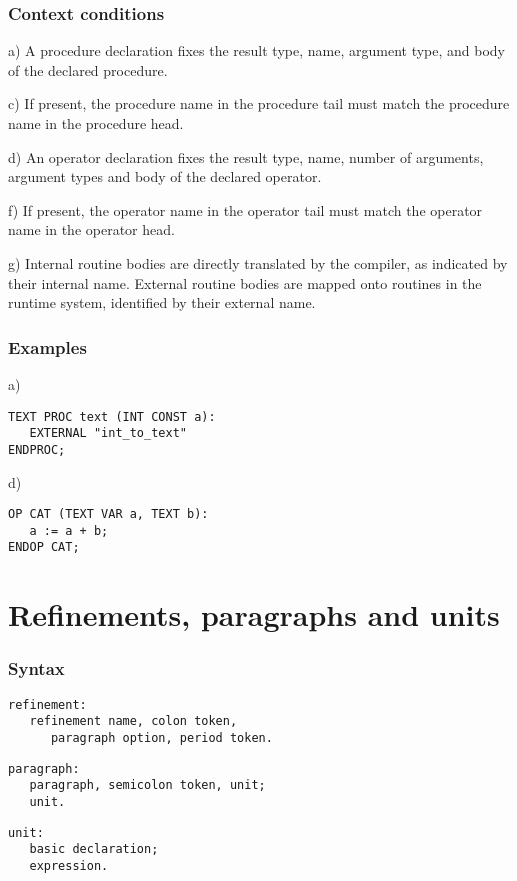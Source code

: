 \documentclass [a4paper,12pt,fleqn]{article}
\begin{document}
\subsubsection*{Context conditions}
\begin{list}{-}{}
\item[a)]
A procedure declaration fixes the result type, name, argument type,
and body of the declared procedure.
\item[c)]
If present, the procedure name in the procedure tail must match
the procedure name in the procedure head.
\item[d)]
An operator declaration fixes the result type, name, number of arguments,
argument types and body of the declared operator.
\item[f)]
If present, the operator name in the operator tail must match
the operator name in the operator head.
\item[g)]
Internal routine bodies are directly translated by the \ELAN compiler,
as indicated by their internal name. External routine bodies are mapped
onto routines in the \ELAN runtime system, identified by their external name.
\end{list}
\subsubsection*{Examples}
\begin{list}{-}{}
\item[a)]
\begin{verbatim}
TEXT PROC text (INT CONST a):
   EXTERNAL "int_to_text"
ENDPROC;
\end{verbatim}
\item[d)] 
\begin{verbatim}
OP CAT (TEXT VAR a, TEXT b):
   a := a + b;
ENDOP CAT;
\end{verbatim}
\end{list}
\section{Refinements, paragraphs and units}
\subsubsection*{Syntax}
\begin{letterlist}
\item
\begin{verbatim}
refinement:
   refinement name, colon token,
      paragraph option, period token.
\end{verbatim}
\item
\begin{verbatim}
paragraph:
   paragraph, semicolon token, unit;
   unit.
\end{verbatim}
\item
\begin{verbatim}
unit:
   basic declaration;
   expression.
\end{verbatim}
\end{letterlist}
\end{document}
